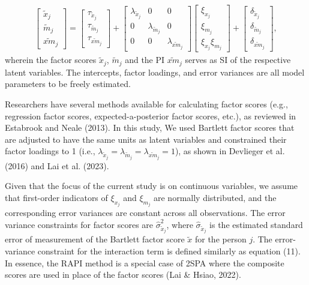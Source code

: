 \documentclass[
  man]{apa6}
\begin{document}
\begin{align}
    \begin{bmatrix}
        \tilde{x}_{j} \\ 
        \tilde{m}_{j} \\
        \widetilde{xm}_{j} 
    \end{bmatrix} = 
    \begin{bmatrix}
        \tau_{\tilde{x}_{j}} \\
        \tau_{\tilde{m}_{j}} \\ 
        \tau_{\widetilde{xm}_{j}}
    \end{bmatrix} + 
    \begin{bmatrix}
        \lambda_{\tilde{x}_{j}} & 0 & 0 \\
        0 & \lambda_{\tilde{m}_{j}} & 0 \\ 
        0 & 0 & \lambda_{\widetilde{xm}_{j}} 
    \end{bmatrix} 
    \begin{bmatrix}
        \xi_{x_{j}} \\  
        \xi_{m_{j}} \\
        \xi_{x_{j}}\xi_{m_{j}}
    \end{bmatrix} +
    \begin{bmatrix}
        \delta_{\tilde{x}_{j}} \\
        \delta_{\tilde{m}_{j}} \\ 
        \delta_{\widetilde{xm}_{j}}
    \end{bmatrix},
\end{align}
wherein the factor scores \(\tilde{x}_{j}\), \(\tilde{m}_{j}\) and the PI \(\widetilde{xm}_{j}\) serves as SI of the respective latent variables. The intercepts, factor loadings, and error variances are all model parameters to be freely estimated.

Researchers have several methods available for calculating factor scores (e.g., regression factor scores, expected-a-posterior factor scores, etc.), as reviewed in Estabrook and Neale (2013). In this study, We used Bartlett factor scores that are adjusted to have the same units as latent variables and constrained their factor loadings to 1 (i.e., \(\lambda_{\tilde{x}_{j}} = \lambda_{\tilde{m}_{j}} = \lambda_{\widetilde{xm}_{j}} = 1\)), as shown in Devlieger et al. (2016) and Lai et al. (2023).

Given that the focus of the current study is on continuous variables, we assume that first-order indicators of \(\xi_{x_{j}}\) and \(\xi_{m_{j}}\) are normally distributed, and the corresponding error variances are constant across all observations. The error variance constraints for factor scores are \(\hat{\sigma}_{\tilde{x}_{j}}^2\), where \(\hat{\sigma}_{\tilde{x}_{j}}\) is the estimated standard error of measurement of the Bartlett factor score \(\tilde{x}\) for the person \(j\). The error-variance constraint for the interaction term is defined similarly as equation (11). In essence, the RAPI method is a special case of 2SPA where the composite scores are used in place of the factor scores (Lai \& Hsiao, 2022).
\end{document}
